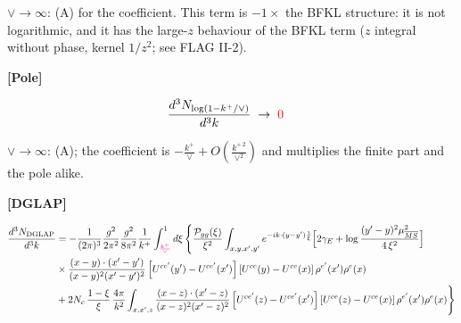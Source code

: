 \documentclass[9pt]{article}
\numberwithin{equation}{section}
\begin{document}
\noindent $\vee\to\infty$: (A) for the coefficient. This term is $-1\times$ the BFKL structure: it is not logarithmic, and it has the large-$z$ behaviour of the BFKL term ($z$ integral without phase, kernel $1/z^{2}$; see FLAG II-2).
\par\smallskip\noindent\textbf{[Pole]}\par\nobreak
\begin{align}
\frac{d^{3}N_{\log(1-k^{+}/\vee)}}{d^{3}k} & \;\to\; {\color{red}0}
\end{align}
\par{}\par\medskip
\noindent $\vee\to\infty$: (A); the coefficient is $-\frac{k^{+}}{\vee}+O(\frac{k^{+\,2}}{\vee^{2}})$ and multiplies the finite part and the pole alike.
\par\smallskip\noindent\textbf{[DGLAP]}\par\nobreak
\begin{align}
\frac{d^{3}N_{\rm DGLAP}}{d^{3}k} & = -\frac{1}{(2\pi)^{3}}\frac{g^{2}}{2\pi^{2}}\frac{g^{2}}{8\pi^{2}}\frac{1}{k^{+}}\int_{{\color{magenta}\frac{k^{+}}{\vee}}}^{1}d\xi\,\Bigg\{\frac{\mathcal P_{gg}(\xi)}{\xi^{2}}\int_{x,y,x',y'}e^{-ik\cdot(y-y')\frac{1}{\xi}}\Big[2\gamma_{E}+\log\frac{(y'-y)^{2}\mu^{2}_{\overline{MS}}}{4\,\xi^{2}}\Big]\notag \\ & \times\frac{(x-y)\cdot(x'-y')}{(x-y)^{2}(x'-y')^{2}}\left[U^{ce'}(y') - U^{ce'}(x')\right]\left[U^{ce}(y) - U^{ce}(x)\right]\rho^{e'}(x')\rho^{e}(x)\notag \\ & +2N_{c}\,\frac{1-\xi}{\xi}\,\frac{4\pi}{k^{2}}\int_{x,x',z}\frac{(x-z)\cdot(x'-z)}{(x-z)^{2}(x'-z)^{2}}\left[U^{ce'}(z) - U^{ce'}(x')\right]\left[U^{ce}(z) - U^{ce}(x)\right]\rho^{e'}(x')\rho^{e}(x)\Bigg\}
\end{align}
\end{document}
